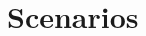 \chapter{Scenarios}
\label{app-scenarios}
\begin{adjustwidth}{-2cm}{-2cm}
	\begin{multicols}{2}
		
	\end{multicols}
\end{adjustwidth}